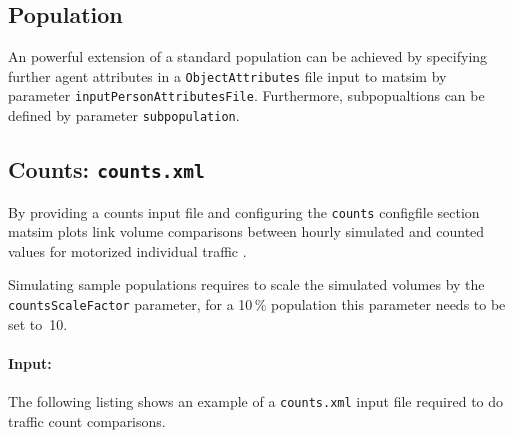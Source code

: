 
\subsection{Population}
\label{sec:extending-population}
An powerful extension of a standard population can be achieved by specifying further agent attributes in a \lstinline|ObjectAttributes| file input to \gls{matsim} by parameter \lstinline|inputPersonAttributesFile|. Furthermore, subpopualtions can be defined by parameter \lstinline|subpopulation|.


\subsection{Counts: \lstinline|counts.xml|}
\label{sec:extending-counts}
By providing a counts input file and configuring the \lstinline|counts| \gls{configfile} section \gls{matsim} plots link volume comparisons between hourly simulated and counted values for motorized individual traffic \citep{Horni_unpub_IVT_2007}. 

Simulating sample populations requires to scale the simulated volumes by the \lstinline|countsScaleFactor| parameter, \eg for a 10\,\% population this parameter needs to be set to~10.

\paragraph{Input:}
The following listing shows an example of a \lstinline|counts.xml| input file required to do traffic count comparisons. 

